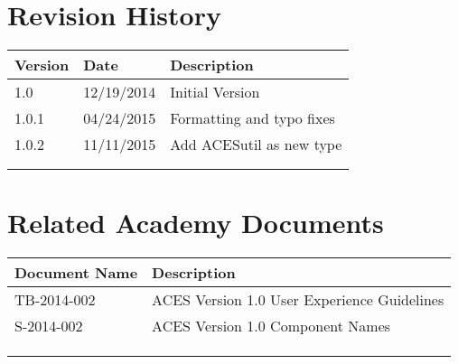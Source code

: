 \prelimsectionformat	%
\chapter{Revision History}

\begin{tabularx}{\linewidth}{|l|l|X|}
    \hline
    Version & Date & Description \\ \hline
    1.0     & 12/19/2014     & Initial Version      \\ \hline
    1.0.1   & 04/24/2015     & Formatting and typo fixes \\ \hline
    1.0.2   & 11/11/2015     & Add ACESutil as new type  \\ \hline
            &      &             \\ \hline
            &      &             \\ \hline
\end{tabularx}

\vspace{0.25in} %
\chapter{Related Academy Documents} %
\begin{tabularx}{\linewidth}{|l|X|}
    \hline
    Document Name & Description \\ \hline
    TB-2014-002  & ACES Version 1.0 User Experience Guidelines \\ \hline
    S-2014-002  & ACES Version 1.0 Component Names \\ \hline
    & \\ \hline
    & \\ \hline
    & \\ \hline
\end{tabularx}